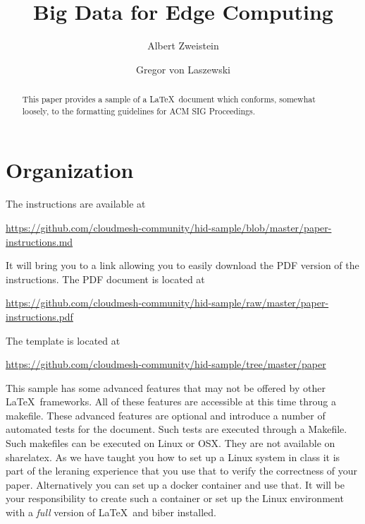 \title{Big Data for Edge Computing}


\author{Albert Zweistein}

\author{Gregor von Laszewski}


\renewcommand{\shortauthors}{G. v. Laszewski}


\begin{abstract}
This paper provides a sample of a \LaTeX\ document which conforms,
somewhat loosely, to the formatting guidelines for
ACM SIG Proceedings.
\end{abstract}



\maketitle

\section{Organization}

The instructions are available at 

\url{https://github.com/cloudmesh-community/hid-sample/blob/master/paper-instructions.md}

It will bring you to a link allowing you to easily download the PDF
version of the instructions. The PDF document is located at 

\url{https://github.com/cloudmesh-community/hid-sample/raw/master/paper-instructions.pdf}


The template is located at

\url{https://github.com/cloudmesh-community/hid-sample/tree/master/paper}


This sample has some advanced features that may not be offered by
other \LaTeX\ frameworks. All of these features are accessible at this
time throug a makefile. These advanced features are optional and
introduce a number of automated tests for the document. Such tests are
executed through a Makefile. Such makefiles can be executed on Linux
or OSX. They are not available on sharelatex. As we have taught you
how to set up a Linux system in class it is part of the leraning
experience that you use that to verify the correctness of your
paper. Alternatively you can set up a docker container and use
that. It will be your responsibility to create such a container or set
up the Linux environment with a \textit{full} version of \LaTeX\ and biber
installed.

